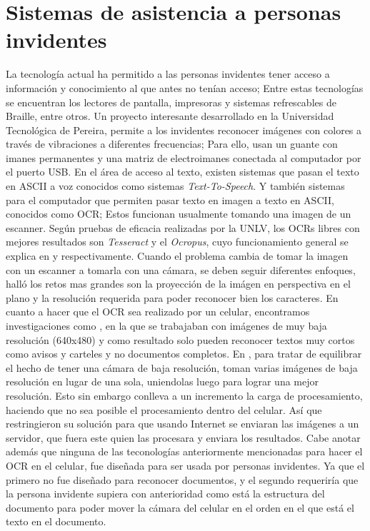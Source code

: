 \documentclass{article}
\begin{document}
	\section{Sistemas de asistencia a personas invidentes}
	La tecnología actual ha permitido a las personas invidentes tener acceso a información
	y conocimiento al que antes no tenían acceso; Entre estas tecnologías se encuentran los
	lectores de pantalla, impresoras y sistemas refrescables de Braille, entre otros.
	Un proyecto interesante desarrollado en la Universidad Tecnológica de Pereira, permite
	a los invidentes reconocer imágenes con colores a través de vibraciones a diferentes
	frecuencias\cite{iris04}; Para ello, usan un guante con imanes permanentes y una matriz
	de electroimanes conectada al computador por el puerto USB.
	En el área de acceso al texto, existen sistemas que pasan el texto en ASCII a voz
	conocidos como sistemas \textit{Text-To-Speech}. Y también sistemas para el computador
	que permiten pasar texto en imagen a texto en ASCII, conocidos como OCR; Estos funcionan
	usualmente tomando una imagen de un escanner. Según pruebas de eficacia realizadas por
	la UNLV, los OCRs libres con mejores resultados son	\textit{Tesseract} y el 
	\textit{Ocropus}, cuyo funcionamiento general se explica en \cite{tesseract1} y
	\cite{ocropus1} respectivamente.\newline
	Cuando el problema cambia de tomar la imagen con un escanner a tomarla con una cámara,
	se deben seguir diferentes enfoques, \cite{doc_analysis3} halló los retos mas
	grandes son la proyección de la imágen en perspectiva en el plano y la resolución
	requerida para poder reconocer bien los caracteres.
	En cuanto a hacer que el OCR sea realizado por un celular, encontramos investigaciones
	como \cite{mob_smallpic}, en la que se trabajaban con imágenes de muy baja resolución
	(640x480) y como resultado solo pueden reconocer textos muy cortos como avisos y carteles
	y no documentos completos.
	En \cite{mob_withpc}, para tratar de equilibrar el hecho de tener una cámara de baja
	resolución, toman varias imágenes de baja resolución en lugar de una sola, uniendolas
	luego para lograr una mejor resolución. Esto sin embargo conlleva a un incremento la
	carga de procesamiento, haciendo que no sea posible el procesamiento dentro del celular.
	Así que restringieron su solución para que usando Internet se enviaran las imágenes a un
	servidor, que fuera este quien las procesara y enviara los resultados.\newline
	Cabe anotar además que ninguna de las teconologías anteriormente mencionadas para hacer
	el OCR en el celular, fue diseñada para ser usada por personas invidentes. Ya que el 
	primero no fue diseñado para reconocer documentos, y el segundo requeriría que la persona
	invidente supiera con anterioridad como está la estructura del documento para poder mover
	la cámara del celular en el orden en el que está el texto en el documento.
	


\end{document}
